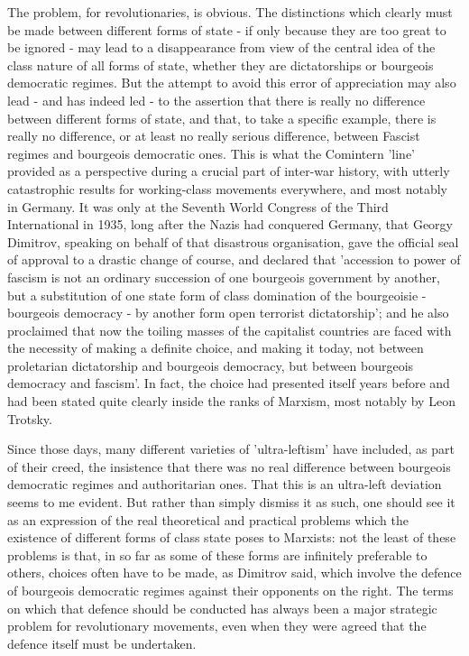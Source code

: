 The problem, for revolutionaries, is obvious. The distinctions which clearly must be made between different forms of state - if only because they are too great to be ignored - may lead to a disappearance from view of the central idea of the class nature of all forms of state, whether they are dictatorships or bourgeois democratic regimes. But the attempt to avoid this error of appreciation may also lead - and has indeed led - to the assertion that there is really no difference between different forms of state, and that, to take a specific example, there is really no difference, or at least no really serious difference, between Fascist regimes and bourgeois democratic ones. This is what the Comintern 'line' provided as a perspective during a crucial part of inter-war history, with utterly catastrophic results for working-class movements everywhere, and most notably in Germany. It was only at the Seventh World Congress of the Third International in 1935, long after the Nazis had conquered Germany, that Georgy Dimitrov, speaking on behalf of that disastrous organisation, gave the official seal of approval to a drastic change of course, and declared that 'accession to power of fascism is not an ordinary succession of one bourgeois government by another, but a substitution of one state form of class domination of the bourgeoisie - bourgeois democracy - by another form open terrorist dictatorship'; and he also proclaimed that now the toiling masses of the capitalist countries are faced with the necessity of making a definite choice, and making it today, not between proletarian dictatorship and bourgeois democracy, but between bourgeois democracy and fascism'. In fact, the choice had presented itself years before and had been stated quite clearly inside the ranks of Marxism, most notably by Leon Trotsky.

Since those days, many different varieties of 'ultra-leftism' have included, as part of their creed, the insistence that there was no real difference between bourgeois democratic regimes and authoritarian ones. That this is an ultra-left deviation seems to me evident. But rather than simply dismiss it as such, one should see it as an expression of the real theoretical and practical problems which the existence of different forms of class state poses to Marxists: not the least of these problems is that, in so far as some of these forms are infinitely preferable to others, choices often have to be made, as Dimitrov said, which involve the defence of bourgeois democratic regimes against their opponents on the right. The terms on which that defence should be conducted has always been a major strategic problem for revolutionary movements, even when they were agreed that the defence itself must be undertaken.

